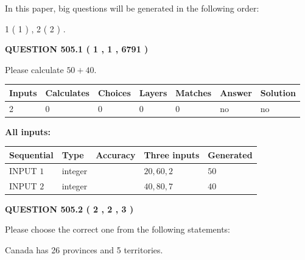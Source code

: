 \documentclass[12pt]{article}
\begin{document}
In this paper, big questions will be generated in the following order: 
   
   
   1 ( 1 )
 ,
   2 ( 2 )
 .
  
\vspace{0.2in}
  
{\textbf{\Large{QUESTION
505.1 
 ( 1 , 1 , 6791 )
}}}
  
  
 
Please calculate $ %
50 +  %
40 $.
 
 
   
   
   
   
\noindent\begin{tabular}{|l|l|l|l|l|l|l|}
 \hline
Inputs & Calculates & Choices & Layers & Matches & Answer & Solution \\ \hline
 2  & 
 0  & 
 0
  & 
 0  & 
 0  & 
  no & 
  no 
  \\ \hline
 \end{tabular}
   
   
   
   
\noindent{}
   
   
   
   
\noindent\vspace{0.1in}\hspace{-0.08in} {\textbf{\Large{All inputs: }}}
   
   
  
  
\noindent\begin{tabular}{|l|l|l|l|l|}
\hline
 Sequential & Type & Accuracy & Three inputs & Generated \\ 
\hline
 
 
  INPUT $  1 $ & integer &  & $
 20
 , 
 60
 , 
 2
 $ & $ 50 $ 
 \\  \hline  
 
 
  INPUT $  2 $ & integer &  & $
 40
 , 
 80
 , 
 7
 $ & $ 40 $ 
 \\  \hline  
 \end{tabular}
   
   
  
\vspace{0.2in}
  
{\textbf{\Large{QUESTION
505.2 
 ( 2 , 2 , 3 )
}}}
  
  
Please choose the correct one from the following statements:
 
 
Canada has  26 provinces and  5 territories.
 
\end{document}

